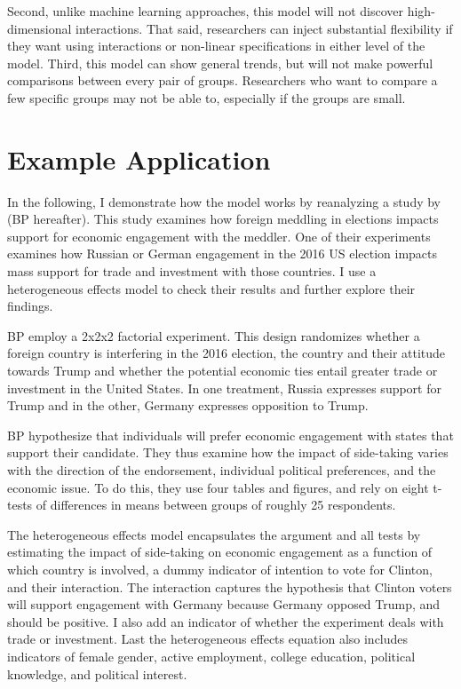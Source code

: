 \documentclass[12pt]{article}
\begin{document}
Second, unlike machine learning approaches, this model will not discover high-dimensional interactions. 
That said, researchers can inject substantial flexibility if they want using interactions or non-linear specifications in either level of the model. 
Third, this model can show general trends, but will not make powerful comparisons between every pair of groups. 
Researchers who want to compare a few specific groups may not be able to, especially if the groups are small.



\section{Example Application} 


In the following, I demonstrate how the model works by reanalyzing a study by \citet{BushPrather2020} (BP hereafter). 
This study examines how foreign meddling in elections impacts support for economic engagement with the meddler. 
One of their experiments examines how Russian or German engagement in the 2016 US election impacts mass support for trade and investment with those countries.
I use a heterogeneous effects model to check their results and further explore their findings. 


BP employ a 2x2x2 factorial experiment.
This design randomizes whether a foreign country is interfering in the 2016 election, the country and their attitude towards Trump and whether the potential economic ties entail greater trade or investment in the United States.
In one treatment, Russia expresses support for Trump and in the other, Germany expresses opposition to Trump. 


BP hypothesize that individuals will prefer economic engagement with states that support their candidate. 
They thus examine how the impact of side-taking varies with the direction of the endorsement, individual political preferences, and the economic issue. 
To do this, they use four tables and figures, and rely on eight t-tests of differences in means between groups of roughly 25 respondents. 


The heterogeneous effects model encapsulates the argument and all tests by estimating the impact of side-taking on economic engagement as a function of which country is involved, a dummy indicator of intention to vote for Clinton, and their interaction. 
The interaction captures the hypothesis that Clinton voters will support engagement with Germany because Germany opposed Trump, and should be positive. 
I also add an indicator of whether the experiment deals with trade or investment. 
Last the heterogeneous effects equation also includes indicators of female gender, active employment, college education, political knowledge, and political interest. 
\end{document}

